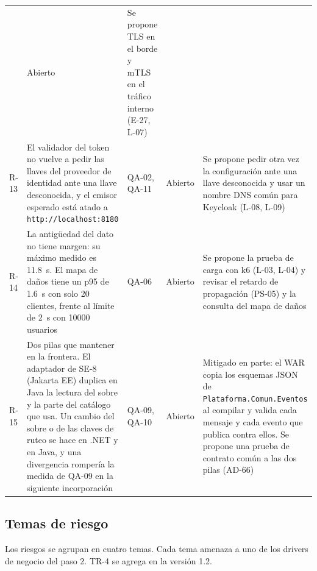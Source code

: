 \documentclass[11pt,letterpaper]{article}
\providecommand{\br}{\discretionary{}{}{}}
\begin{document}
\begin{longtable}{L{1.05cm} L{4.8cm} L{1.9cm} L{1.9cm} L{5.5cm}}
& Abierto & Se propone TLS en el borde y mTLS en el tráfico interno (E-27, L-07) \\
R-13 & El validador del token no vuelve a pedir las llaves del proveedor de identidad ante una llave
desconocida, y el emisor esperado está atado a \texttt{http://localhost:8180} & QA-02, QA-11 &
Abierto & Se propone pedir otra vez la configuración ante una llave desconocida y usar un nombre DNS
común para Keycloak (L-08, L-09) \\
R-14 & La antigüedad del dato no tiene margen: su máximo medido es \qty{11.8}{\second}. El mapa de
daños tiene un p95 de \qty{1.6}{\second} con solo 20 clientes, frente al límite de \qty{2}{\second}
con \num{10000} usuarios & QA-06 & Abierto & Se propone la prueba de carga con k6 (L-03, L-04) y
revisar el retardo de propagación (PS-05) y la consulta del mapa de daños \\
R-15 & Dos pilas que mantener en la frontera. El adaptador de SE-8 (Jakarta EE) duplica en Java la
lectura del sobre y la parte del catálogo que usa. Un cambio del sobre o de las claves de ruteo se
hace en .NET y en Java, y una divergencia rompería la medida de QA-09 en la siguiente
incorporación & QA-09, QA-10 & Abierto & Mitigado en parte: el WAR copia los esquemas JSON de
\texttt{Plataforma.\br Comun.\br Eventos} al compilar y valida cada mensaje y cada evento que
publica contra ellos. Se propone una prueba de contrato común a las dos pilas (AD-66) \\
\end{longtable}

\subsection{Temas de riesgo}
\label{sec:temas}

Los riesgos se agrupan en cuatro temas. Cada tema amenaza a uno de los drivers de negocio del paso
2. TR-4 se agrega en la versión 1.2.
\end{document}
